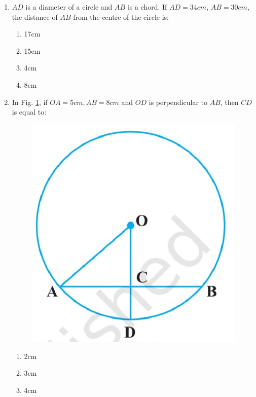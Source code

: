 \begin{enumerate}[label=\thesection.\arabic*,ref=\thesection.\theenumi]

\item $AD$ is a diameter of a circle and $AB$ is a chord. If $AD = 34 cm$, $AB = 30 cm$, the distance of $AB$ from the centre of the circle is:
\begin{enumerate}
\item 17cm
\item 15cm
\item 4cm
\item 8cm
\end{enumerate}
\item In Fig. \ref{fig:exemplar/9.10.1/10.3}, if $OA = 5cm, AB = 8cm$ and $OD$ is perpendicular to $AB$, then $CD$ is equal to:
\begin{figure}[H]
\centering
\includegraphics[width=\columnwidth]{exemplar/9.10.1/figs/10.3.jpg}
\caption{}
\label{fig:exemplar/9.10.1/10.3}
\end{figure}
\begin{enumerate}
\item 2cm
\item 3cm
\item 4cm

\end{enumerate}
\end{enumerate}
